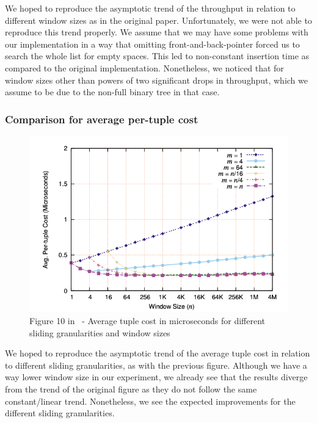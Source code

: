 We hoped to reproduce the asymptotic trend of the throughput in relation to different window sizes as in the original paper.
Unfortunately, we were not able to reproduce this trend properly.
We assume that we may have some problems with our implementation in a way that omitting front-and-back-pointer
forced us to search the whole list for empty spaces.
This led to non-constant insertion time as compared to the original implementation.
Nonetheless, we noticed that for window sizes other than powers of two significant drops in throughput,
which we assume to be due to the non-full binary tree in that case.

\subsubsection{Comparison for average per-tuple cost}



\begin{figure}[H]
	\centering
	\includegraphics[width=\linewidth]{../figures/fig10}
	\caption{Figure 10 in~\cite{GeneralIncremental15} -  Average tuple cost in microseconds for different sliding granularities and window sizes}
	\label{fig:original_architecture}
\end{figure}

We hoped to reproduce the asymptotic trend of the average tuple cost in relation to different sliding granularities, as with the previous figure.
Although we have a way lower window size in our experiment,
we already see that the results diverge from the trend of the original figure as they do not follow the same constant/linear trend.
Nonetheless, we see the expected improvements for the different sliding granularities.


